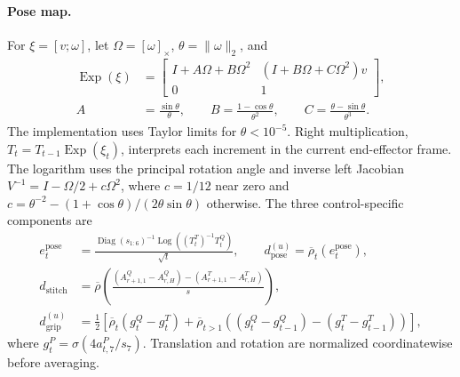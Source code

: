 \paragraph{Pose map.}
For $\xi=[v;\omega]$, let $\Omega=[\omega]_{\times}$, $\theta=\lVert\omega\rVert_2$, and
\begin{equation}
\begin{aligned}
\operatorname{Exp}(\xi)
&=\begin{bmatrix}
I+A\Omega+B\Omega^2&(I+B\Omega+C\Omega^2)v\\
0&1
\end{bmatrix},\\
A&=\frac{\sin\theta}{\theta},\qquad
B=\frac{1-\cos\theta}{\theta^2},\qquad
C=\frac{\theta-\sin\theta}{\theta^3}.
\end{aligned}
\label{eq:se3_exp_detail}
\end{equation}
The implementation uses Taylor limits for $\theta<10^{-5}$. Right multiplication, $T_t=T_{t-1}\operatorname{Exp}(\xi_t)$, interprets each increment in the current end-effector frame. The logarithm uses the principal rotation angle and inverse left Jacobian $V^{-1}=I-\Omega/2+c\Omega^2$, where $c=1/12$ near zero and $c=\theta^{-2}-(1+\cos\theta)/(2\theta\sin\theta)$ otherwise. The three control-specific components are
\begin{align}
 e^{\mathrm{pose}}_t&=\frac{\operatorname{Diag}(s_{1:6})^{-1}
 \operatorname{Log}((T^T_t)^{-1}T^Q_t)}{\sqrt t},\qquad
 d_{\mathrm{pose}}^{(u)}=\overline\rho_t(e^{\mathrm{pose}}_t),
 \label{eq:pose}\\
 d_{\mathrm{stitch}}&=\overline{\rho}\!\left(
 \frac{(A^Q_{r+1,1}-A^Q_{r,H})-(A^T_{r+1,1}-A^T_{r,H})}{s}
 \right),
 \label{eq:stitch}\\
 d_{\mathrm{grip}}^{(u)}&=\tfrac12\left[
 \overline\rho_t(g^Q_t-g^T_t)+
 \overline\rho_{t>1}((g^Q_t-g^Q_{t-1})-(g^T_t-g^T_{t-1}))\right],
 \label{eq:gripper}
\end{align}
where $g^P_t=\sigma(4a^P_{t,7}/s_7)$. Translation and rotation are normalized coordinatewise before averaging.

